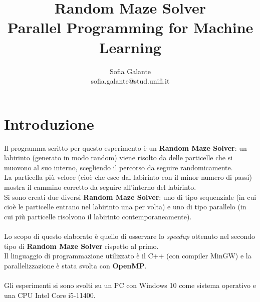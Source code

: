 \documentclass[10pt,twocolumn,letterpaper]{article}
\begin{document}
\title{Random Maze Solver\\
\large Parallel Programming for Machine Learning}

\author{Sofia Galante\\
\small sofia.galante@stud.unifi.it\\
}
\date{}
\maketitle
\thispagestyle{empty}

\section{Introduzione}

Il programma scritto per questo esperimento è un \textbf{Random Maze Solver}: un labirinto (generato in modo random) viene risolto da delle particelle che si muovono al suo interno, scegliendo il percorso da seguire randomicamente.\\
La particella più veloce (cioè che esce dal labirinto con il minor numero di passi) mostra il cammino corretto da seguire all'interno del labirinto.\\
Si sono creati due diversi \textbf{Random Maze Solver}: uno di tipo sequenziale (in cui cioè le particelle entrano nel labirinto una per volta) e uno di tipo parallelo (in cui più particelle risolvono il labirinto contemporaneamente).\\
\\
Lo scopo di questo elaborato è quello di osservare lo \textit{speedup} ottenuto nel secondo tipo di \textbf{Random Maze Solver} rispetto al primo.\\
Il linguaggio di programmazione utilizzato è il C++ (con compiler MinGW) e la parallelizzazione è stata svolta con \textbf{OpenMP}.\\
\\
Gli esperimenti si sono svolti su un PC con Windows 10 come sistema operativo e una CPU Intel Core i5-11400.
\end{document}
